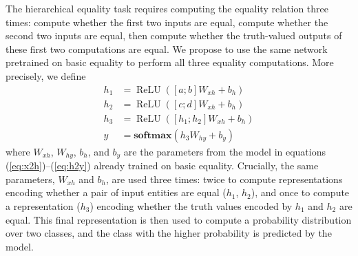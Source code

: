 \documentclass{article}
\newcommand{\eg}[1]{(\ref{#1})}
\newcommand{\dasheg}[2]{\eg{#1}--\eg{#2}}
\newcommand{\softmax}{\mathbf{softmax}}
\DeclareMathOperator{\ReLU}{ReLU}
\begin{document}
The hierarchical equality task requires computing the equality relation three times: compute whether the first two inputs are equal, compute whether the second two inputs are equal, then compute whether the truth-valued outputs of these first two computations are equal. We propose to use the same network pretrained on basic equality to perform all three equality computations. More precisely, we define
%
\begin{align}
h_1 &= \ReLU([a;b]W_{xh} + b_{h})\\
h_2 &= \ReLU([c;d]W_{xh} + b_{h})\\
h_3 &= \ReLU([h_1;h_2]W_{xh} + b_{h}) \\
y &= \softmax(h_3W_{hy} + b_{y})
\end{align}
%
where $W_{xh}$, $W_{hy}$, $b_h$, and $b_y$ are the parameters from the model in equations \dasheg{eq:x2h}{eq:h2y} already trained on basic equality. Crucially, the same parameters, $W_{xh}$ and $b_h$, are used three times: twice to compute representations encoding whether a pair of input entities are equal ($h_1$, $h_2$), and once to compute a representation ($h_{3}$) encoding whether the truth values encoded by $h_1$ and $h_2$ are equal. This final representation is then used to compute a probability distribution over two classes, and the class with the higher probability is predicted by the model.
\end{document}
